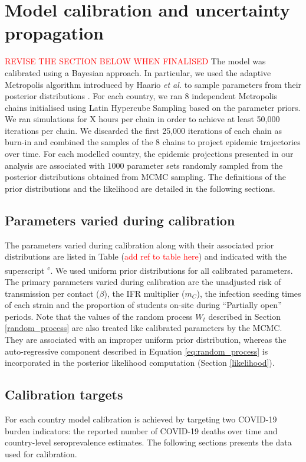\section{Model calibration and uncertainty propagation}
\label{calibration}
\textcolor{red}{REVISE THE SECTION BELOW WHEN FINALISED}
The model was calibrated using a Bayesian approach. In particular, we used the adaptive 
Metropolis algorithm introduced by Haario \textit{et al.} to sample parameters from their 
posterior distributions \cite{haario-2001}. For each country, we ran 8 independent Metropolis 
chains initialised using Latin Hypercube Sampling based on the parameter priors. 
We ran simulations for X hours per chain in order to achieve at least 50,000 iterations per 
chain. We discarded the first 25,000 iterations of each chain as burn-in and combined the 
samples of the 8 chains to project epidemic trajectories over time. 
For each modelled country, the epidemic projections presented in our analysis are associated with 1000 parameter sets 
randomly sampled from the posterior distributions obtained from MCMC sampling. 
The definitions of the prior distributions and the likelihood are detailed in the following sections.

\subsection{Parameters varied during calibration}

The parameters varied during calibration along with their associated prior distributions 
are listed in Table (\textcolor{red}{add ref to table here}) and indicated with the superscript \textsuperscript{c}.
We used uniform prior distributions for all calibrated parameters. The primary parameters varied during calibration are 
the unadjusted risk of transmission per contact ($\beta$), the IFR multiplier ($m_C$), the infection seeding times of 
each strain and the proportion of students on-site during ``Partially open'' periods. Note that the values of the random 
process $W_t$ described in Section \ref{random_process} are also treated like calibrated parameters by the MCMC. 
They are associated with an improper uniform prior distribution, whereas the auto-regressive component described in 
Equation \ref{eq:random_process} is incorporated in the posterior likelihood computation (Section \ref{likelihood}).

\subsection{Calibration targets}
\label{targets}
For each country model calibration is achieved by targeting two COVID-19 burden indicators: the 
reported number of COVID-19 deaths over time and country-level seroprevalence estimates. The following sections
presents the data used for calibration.
